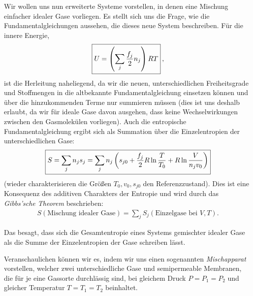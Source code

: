 Wir wollen uns nun erweiterte Systeme vorstellen, in denen eine Mischung einfacher idealer Gase vorliegen. Es stellt sich uns die Frage, wie die Fundamentalgleichungen aussehen, die dieses neue System beschreiben. Für die innere Energie,
\begin{align*}
    \boxed{U=\left(\sum_j\frac{f_j}{2}n _j\right)RT}\:,
\end{align*}
ist die Herleitung naheliegend, da wir die neuen, unterschiedlichen Freiheitsgrade und Stoffmengen in die altbekannte Fundamentalgleichung einsetzen können und über die hinzukommenden Terme nur summieren müssen (dies ist uns deshalb erlaubt, da wir für ideale Gase davon ausgehen, dass keine Wechselwirkungen zwischen den Gasmolekülen vorliegen). Auch die entropische Fundamentalgleichung ergibt sich als Summation über die Einzelentropien der unterschiedlichen Gase:
\begin{align*}
    \boxed{S=\sum_jn _js_j=\sum_jn _j\left(s_{j0}+\frac{f_j}{2}R\ln\frac{T}{T_0}+R\ln\frac{V}{n _jv_0}\right)}
\end{align*}
(wieder charakterisieren die Größen $T_0,v_0,s_{j0}$ den Referenzzustand).
Dies ist eine Konsequenz des additiven Charakters der Entropie und wird durch das \emph{Gibbs'sche Theorem} beschrieben:
\begin{align*}
    \boxed{S(\text{Mischung idealer Gase})=\sum_jS_j(\text{Einzelgase bei } V,T)}.
\end{align*}
\begin{formal}
    Das  besagt, dass sich die Gesamtentropie eines Systems gemischter idealer Gase als die Summe der Einzelentropien der Gase schreiben lässt.
\end{formal}
Veranschaulichen können wir es, indem wir uns einen sogenannten \emph{Mischapparat} vorstellen, welcher zwei unterschiedliche Gase und semipermeable Membranen, die für je eine Gassorte durchlässig sind, bei gleichem Druck $P=P_1=P_2$ und gleicher Temperatur $T=T_1=T_2$ beinhaltet. 

